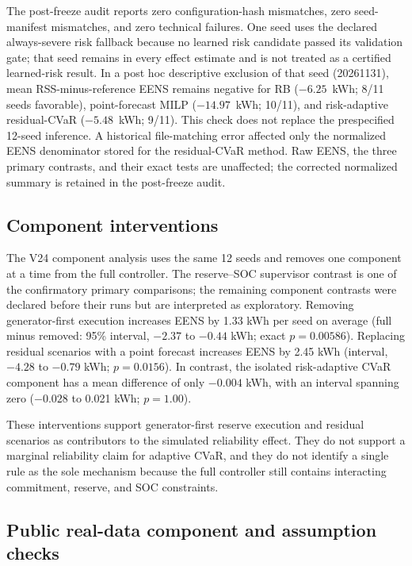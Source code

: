 The post-freeze audit reports zero configuration-hash mismatches, zero seed-
manifest mismatches, and zero technical failures. One seed uses the declared
always-severe risk fallback because no learned risk candidate passed its
validation gate; that seed remains in every effect estimate and is not treated
as a certified learned-risk result. In a post hoc descriptive exclusion of that
seed (20261131), mean RSS-minus-reference EENS remains negative for RB
($-6.25$~kWh; 8/11 seeds favorable), point-forecast MILP ($-14.97$~kWh;
10/11), and risk-adaptive residual-CVaR ($-5.48$~kWh; 9/11). This check does
not replace the prespecified 12-seed inference. A historical file-matching error affected
only the normalized EENS denominator stored for the residual-CVaR method. Raw
EENS, the three primary contrasts, and their exact tests are unaffected; the
corrected normalized summary is retained in the post-freeze audit.

\subsection{Component interventions}
\label{component-interventions}

The V24 component analysis uses the same 12 seeds and removes one component at
a time from the full controller. The reserve--SOC supervisor contrast is one of
the confirmatory primary comparisons; the remaining component contrasts were
declared before their runs but are interpreted as exploratory. Removing
generator-first execution increases EENS by 1.33 kWh per seed on average (full
minus removed: 95\% interval, $-2.37$ to $-0.44$ kWh; exact $p=0.00586$).
Replacing residual scenarios with a point forecast increases EENS by 2.45 kWh
(interval, $-4.28$ to $-0.79$ kWh; $p=0.0156$). In contrast, the isolated
risk-adaptive CVaR component has a mean difference of only $-0.004$ kWh, with
an interval spanning zero ($-0.028$ to 0.021 kWh; $p=1.00$).

These interventions support generator-first reserve execution and residual
scenarios as contributors to the simulated reliability effect. They do not
support a marginal reliability claim for adaptive CVaR, and they do not
identify a single rule as the sole mechanism because the full controller still
contains interacting commitment, reserve, and SOC constraints.

\subsection{Public real-data component and assumption checks}
\label{public-real-data-results}

